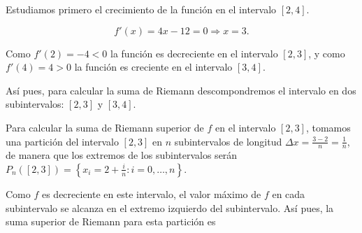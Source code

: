 \documentclass[
  spanish,
  a4paper,
]{scrreport}
\theoremstyle{definition}
\theoremstyle{remark}
\begin{document}
\begin{tcolorbox}[enhanced jigsaw, arc=.35mm, bottomrule=.15mm, bottomtitle=1mm, breakable, colback=white, colbacktitle=quarto-callout-tip-color!10!white, colframe=quarto-callout-tip-color-frame, coltitle=black, left=2mm, leftrule=.75mm, opacityback=0, opacitybacktitle=0.6, rightrule=.15mm, title=\textcolor{quarto-callout-tip-color}{\faLightbulb}\hspace{0.5em}{Solución}, titlerule=0mm, toprule=.15mm, toptitle=1mm]

Estudiamos primero el crecimiento de la función en el intervalo
\([2, 4]\).

\[
f'(x) = 4x - 12 = 0 \Rightarrow x = 3.
\]

Como \(f'(2) = -4 < 0\) la función es decreciente en el intervalo
\([2, 3]\), y como \(f'(4) = 4 > 0\) la función es creciente en el
intervalo \([3, 4]\).

Así pues, para calcular la suma de Riemann descompondremos el intervalo
en dos subintervalos: \([2, 3]\) y \([3, 4]\).

Para calcular la suma de Riemann superior de \(f\) en el intervalo
\([2,3]\), tomamos una partición del intervalo \([2, 3]\) en \(n\)
subintervalos de longitud \(\Delta x = \frac{3-2}{n} = \frac{1}{n}\), de
manera que los extremos de los subintervalos serán
\(P_n([2,3]) = \left\{x_i = 2 + \frac{i}{n}: i = 0, \ldots, n\right\}\).

Como \(f\) es decreciente en este intervalo, el valor máximo de \(f\) en
cada subintervalo se alcanza en el extremo izquierdo del subintervalo.
Así pues, la suma superior de Riemann para esta partición es


\end{tcolorbox}
\end{document}
